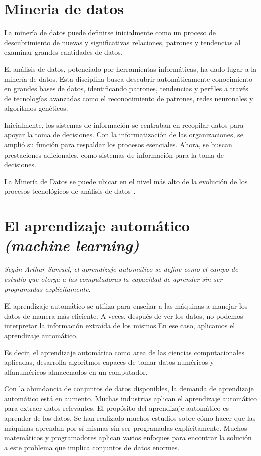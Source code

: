\section{Mineria de datos}
La minería de datos puede definirse inicialmente como un proceso de descubrimiento de nuevas y significativas relaciones, patrones y tendencias al examinar grandes cantidades de datos\cite{perez2007mineria}.

El análisis de datos, potenciado por herramientas informáticas, ha dado lugar a la minería de datos. Esta disciplina busca descubrir automáticamente conocimiento en grandes bases de datos, identificando patrones, tendencias y perfiles a través de tecnologías avanzadas como el reconocimiento de patrones, redes neuronales y algoritmos genéticos.

Inicialmente, los sistemas de información se centraban en recopilar datos para apoyar la toma de decisiones. Con la informatización de las organizaciones, se amplió su función para respaldar los procesos esenciales. Ahora, se buscan prestaciones adicionales, como sistemas de información para la toma de decisiones.

La Minería de Datos se puede ubicar en el nivel más alto de la evolución de los procesos tecnológicos de análisis de datos \cite{martinez2001mineria}.

\section{El aprendizaje automático \textit{(machine learning)}}

\textit{Según Arthur Samuel, el aprendizaje automático se define como el campo de estudio que otorga a las computadoras la capacidad de aprender sin ser programadas explícitamente}\cite{mahesh2020machine}. 

El aprendizaje automático se utiliza para enseñar a las máquinas a manejar los datos de manera más eficiente. A veces, después de ver los datos, no podemos interpretar la información extraída de los mismos.En ese caso, aplicamos el aprendizaje automático.

Es decir, el aprendizaje automático como area de las ciencias computacionales aplicadas, desarrolla algoritmos capaces de tomar datos numéricos y alfanuméricos almacenados en un computador\cite{herrera2020prediccion}. 

Con la abundancia de conjuntos de datos disponibles, la demanda de aprendizaje automático está en aumento. Muchas industrias aplican el aprendizaje automático para extraer datos relevantes. El propósito del aprendizaje automático es aprender de los datos. Se han realizado muchos estudios sobre cómo hacer que las máquinas aprendan por sí mismas sin ser programadas explícitamente. Muchos matemáticos y programadores aplican varios enfoques para encontrar la solución a este problema que implica conjuntos de datos enormes\cite{mahesh2020machine}.


